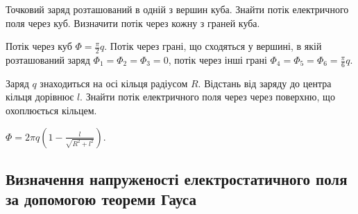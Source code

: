 \begin{problem}
Точковий заряд розташований в одній з вершин куба. Знайти потік електричного поля через куб. Визначити потік через кожну з граней куба.
\begin{solution}
	Потік через куб $\Phi = \frac{\pi}{2}q$. Потік через грані, що сходяться у вершині, в якій розташований заряд $\Phi_1 = \Phi_2 =\Phi_3 = 0$, потік через інші грані $\Phi_4 = \Phi_5 =\Phi_6 = \frac{\pi}{6}q$.
\end{solution}
\end{problem}


\begin{problem}
Заряд $q$ знаходиться на осі кільця радіусом $R$. Відстань від заряду до центра кільця дорівнює $l$. Знайти потік електричного поля через через поверхню, що охоплюється кільцем.
\begin{solution}
	$\Phi = 2\pi q\left( 1 - \frac{l}{\sqrt{R^2 + l^2}}\right) $.
\end{solution}
\end{problem}

\subsection*{Визначення напруженості електростатичного поля за допомогою теореми Гауса}


